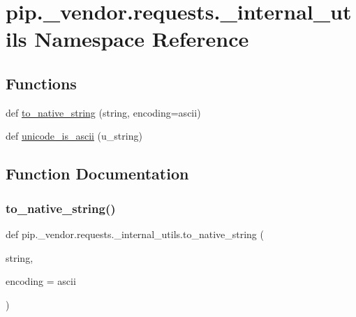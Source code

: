 \hypertarget{namespacepip_1_1__vendor_1_1requests_1_1__internal__utils}{}\section{pip.\+\_\+vendor.\+requests.\+\_\+internal\+\_\+utils Namespace Reference}
\label{namespacepip_1_1__vendor_1_1requests_1_1__internal__utils}
\subsection*{Functions}
\begin{DoxyCompactItemize}
\item 
def \hyperlink{namespacepip_1_1__vendor_1_1requests_1_1__internal__utils_a941599aed1407b1dc7cb6206a2b23e1c}{to\+\_\+native\+\_\+string} (string, encoding=\textquotesingle{}ascii\textquotesingle{})
\item 
def \hyperlink{namespacepip_1_1__vendor_1_1requests_1_1__internal__utils_ab1a1466002e5458924eab81a3a30d0ad}{unicode\+\_\+is\+\_\+ascii} (u\+\_\+string)
\end{DoxyCompactItemize}


\subsection{Function Documentation}
\mbox{\label{namespacepip_1_1__vendor_1_1requests_1_1__internal__utils_a941599aed1407b1dc7cb6206a2b23e1c}} 
\subsubsection{\texorpdfstring{to\+\_\+native\+\_\+string()}{to\_native\_string()}}
{\footnotesize\ttfamily def pip.\+\_\+vendor.\+requests.\+\_\+internal\+\_\+utils.\+to\+\_\+native\+\_\+string (\begin{DoxyParamCaption}\item[{}]{string,  }\item[{}]{encoding = {\ttfamily \textquotesingle{}ascii\textquotesingle{}} }\end{DoxyParamCaption})}

